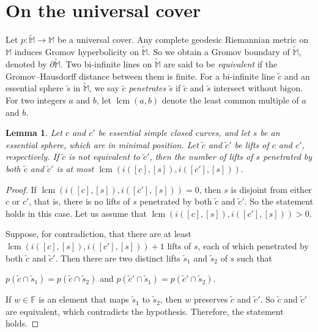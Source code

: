 \documentclass[12pt,a4paper]{amsart}
\numberwithin{equation}{section}
\newcommand{\FF}{\mathbb{F}}
\newcommand{\MM}{\mathbb{M}}
\theoremstyle{plain}
\newtheorem{lemma}[theorem]{Lemma}
\theoremstyle{definition}
\theoremstyle{remark}
\begin{document}
\section{On the universal cover}

Let $p: \widetilde{\MM} \to \MM$ be a universal cover.
Any complete geodesic Riemannian metric on $\MM$ induces Gromov hyperbolicity on $\widetilde{\MM}$.
So we obtain a Gromov boundary of $\widetilde{\MM}$, denoted by $\partial\widetilde{\MM}$.
Two bi-infinite lines on $\widetilde{\MM}$ are said to be \emph{equivalent} if the Gromov--Hausdorff distance between them is finite.
For a bi-infinite line $\tilde{c}$ and an essential sphere $\tilde{s}$ in $\widetilde{\MM}$, we say $\tilde{c}$ \emph{penetrates} $\tilde{s}$ if $\tilde{c}$ and $\tilde{s}$ intersect without bigon.
For two integers $a$ and $b$, let $\operatorname{lcm}(a, b)$ denote the least common multiple of $a$ and $b$.

\begin{lemma} \label{lem:parallel}
    Let $c$ and $c'$ be essential simple closed curves, and let $s$ be an essential sphere, which are in minimal position.
    Let $\tilde{c}$ and $\tilde{c}'$ be lifts of $c$ and $c'$, respectively.
    If $\tilde{c}$ is not equivalent to $\tilde{c}'$, then the number of lifts of $s$ penetrated by both $\tilde{c}$ and $\tilde{c}'$ is at most $\operatorname{lcm}(i([c],[s]), i([c'],[s]))$.
\end{lemma}

\begin{proof}
    If $\operatorname{lcm}(i([c],[s]), i([c'],[s])) = 0$, then $s$ is disjoint from either $c$ or $c'$, that is, there is no lifts of $s$ penetrated by both $\tilde{c}$ and $\tilde{c}'$.
    So the statement holds in this case.
    Let us assume that $\operatorname{lcm}(i([c],[s]), i([c'],[s])) > 0$.
    
    Suppose, for contradiction, that there are at least $\operatorname{lcm}(i([c],[s]), i([c'], [s])) + 1$ lifts of $s$, each of which penetrated by both $\tilde{c}$ and $\tilde{c}'$.
    Then there are two distinct lifts $\tilde{s}_1$ and $\tilde{s}_2$ of $s$ such that \begin{center}$p(\tilde{c} \cap \tilde{s}_1) = p(\tilde{c} \cap \tilde{s}_2)$ and $p(\tilde{c}' \cap \tilde{s}_1) = p(\tilde{c}' \cap \tilde{s}_2)$.\end{center}
    If $w \in \FF$ is an element that maps $\tilde{s}_1$ to $\tilde{s}_2$, then $w$ preserves $\tilde{c}$ and $\tilde{c}'$.
    So $\tilde{c}$ and $\tilde{c}'$ are equivalent, which contradicts the hypothesis.
    Therefore, the statement holds.
\end{proof}
\end{document}
